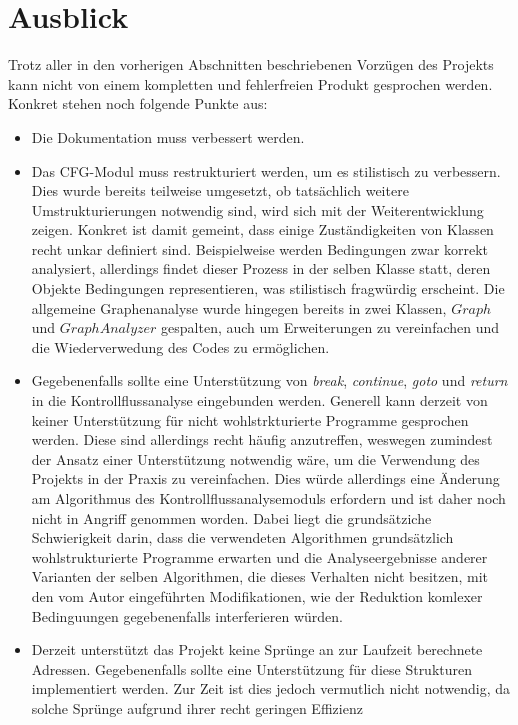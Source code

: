 \documentclass[11pt]{article}
\begin{document}
\section{Ausblick}
Trotz aller in den vorherigen Abschnitten beschriebenen Vorzügen des Projekts kann nicht von
einem kompletten und fehlerfreien Produkt gesprochen werden. Konkret stehen noch folgende Punkte aus:
\begin{itemize}
	\item{Die Dokumentation muss verbessert werden.}
	\item{Das CFG-Modul muss restrukturiert werden, um es stilistisch zu verbessern. Dies wurde
		bereits teilweise umgesetzt, ob tatsächlich weitere Umstrukturierungen notwendig sind,
		wird sich mit der Weiterentwicklung zeigen. Konkret ist damit gemeint, dass einige
		Zuständigkeiten von Klassen recht unkar definiert sind. Beispielweise werden Bedingungen
		zwar korrekt analysiert, allerdings findet dieser Prozess in der selben Klasse statt,
		deren Objekte Bedingungen representieren, was stilistisch fragwürdig erscheint. Die
		allgemeine Graphenanalyse wurde hingegen bereits in zwei Klassen, $Graph$ und $GraphAnalyzer$
		gespalten, auch um Erweiterungen zu vereinfachen und die Wiederverwedung des Codes
		zu ermöglichen.
	}
	\item{Gegebenenfalls sollte eine Unterstützung von \textit{break}, \textit{continue},
		\textit{goto} und \textit{return} in die Kontrollflussanalyse eingebunden werden.
		Generell kann derzeit von keiner Unterstützung für nicht wohlstrkturierte Programme
		gesprochen werden. Diese sind allerdings recht häufig anzutreffen, weswegen zumindest
		der Ansatz einer Unterstützung notwendig wäre, um die Verwendung des Projekts in der
		Praxis zu vereinfachen. Dies würde allerdings eine Änderung am Algorithmus des
		Kontrollflussanalysemoduls erfordern und ist daher noch nicht in Angriff genommen worden.
		Dabei liegt die grundsätziche Schwierigkeit darin, dass die verwendeten Algorithmen
		grundsätzlich wohlstrukturierte Programme erwarten und die Analyseergebnisse anderer
		Varianten der selben Algorithmen, die dieses Verhalten nicht besitzen, mit den vom
		Autor eingeführten Modifikationen, wie der Reduktion komlexer Bedinguungen gegebenenfalls
		interferieren würden.
	}
	\item{Derzeit unterstützt das Projekt keine Sprünge an zur Laufzeit berechnete Adressen. Gegebenenfalls
		sollte eine Unterstützung für diese Strukturen implementiert werden. Zur Zeit ist dies
		jedoch vermutlich nicht notwendig, da solche Sprünge aufgrund ihrer recht geringen Effizienz
}
\end{itemize}
\end{document}
